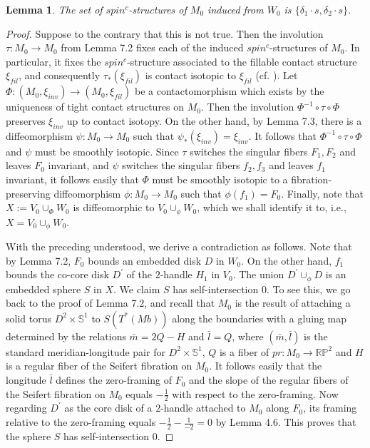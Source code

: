 \documentclass[11pt]{amsart}
\theoremstyle{plain}
\numberwithin{theorem}{section}
\newtheorem{lemma}[theorem]{Lemma}
\theoremstyle{definition}
\newcommand{\R}{{\mathbb R}}
\renewcommand{\P}{{\mathbb P}}
\newcommand{\s}{{\mathbb S}}
\begin{document}
\begin{lemma}
The set of $spin^c$-structures of $M_0$ induced from $W_0$ is $\{\delta_1\cdot s,\delta_2\cdot s\}$.
\end{lemma}

\begin{proof}
Suppose to the contrary that this is not true. Then the involution $\tau: M_0\rightarrow M_0$
from Lemma 7.2 fixes each of the induced $spin^c$-structures of $M_0$. In particular, it fixes
the $spin^c$-structure associated to the fillable contact structure $\xi_{fil}$, and consequently
$\tau_\ast(\xi_{fil})$ is contact isotopic to $\xi_{fil}$ (cf. \cite{GLS}). Let  
$\Phi: (M_0,\xi_{inv})\rightarrow (M_0,\xi_{fil})$ be a contactomorphism which exists by the uniqueness
of tight contact structures on $M_0$. Then the involution $\Phi^{-1}\circ \tau \circ \Phi$ preserves
$\xi_{inv}$ up to contact isotopy. On the other hand, by Lemma 7.3, there is a diffeomorphism
$\psi: M_0\rightarrow M_0$ such that $\psi_\ast (\xi_{inv})=\xi_{inv}$. It follows that 
$\Phi^{-1}\circ \tau \circ \Phi$ and $\psi$ must be smoothly isotopic. Since $\tau$ switches the
singular fibers $F_1,F_2$ and leaves $F_0$ invariant, and $\psi$ switches the singular fibers
$f_2,f_3$ and leaves $f_1$ invariant, it follows easily that $\Phi$ must be smoothly isotopic 
to a fibration-preserving diffeomorphism $\phi: M_0\rightarrow M_0$ such that $\phi(f_1)=F_0$. 
Finally, note that $X:=V_0\cup_\Phi W_0$ is diffeomorphic to $V_0\cup_\phi W_0$, which we shall identify it to, i.e., $X=V_0\cup_\phi W_0$.

With the preceding understood, we derive a contradiction as follows. Note that by Lemma 7.2, 
$F_0$ bounds an embedded disk $D$ in $W_0$. On the other hand, $f_1$ bounds the co-core disk
$D^\prime$ of the $2$-handle $H_1$ in $V_0$. The union $D^\prime\cup_\phi D$ is an embedded
sphere $S$ in $X$. We claim $S$ has self-intersection $0$. To see this, we go back to the proof of
Lemma 7.2, and recall that $M_0$ is the result of attaching a solid torus $D^2\times \s^1$ to 
$S(T^\ast (Mb))$ along the boundaries with a gluing map determined by the relations
$\bar{m}=2Q-H$ and $\bar{l}=Q$, where $(\bar{m},\bar{l})$ is the standard meridian-longitude 
pair for $D^2\times \s^1$, $Q$ is a fiber of $pr: M_0\rightarrow \R\P^2$ and $H$ is a regular
fiber of the Seifert fibration on $M_0$. It follows easily that the longitude $\bar{l}$ defines the zero-framing of $F_0$ and the slope of the regular fibers of the Seifert fibration on $M_0$ equals 
$-\frac{1}{2}$ with respect to the zero-framing. Now regarding $D^\prime$ as the core disk of a
$2$-handle attached to $M_0$ along $F_0$, its framing relative to the zero-framing equals 
$-\frac{1}{2}-\frac{1}{-2}=0$ by Lemma 4.6. This proves that the sphere $S$ has self-intersection 
$0$.


\end{proof}
\end{document}

